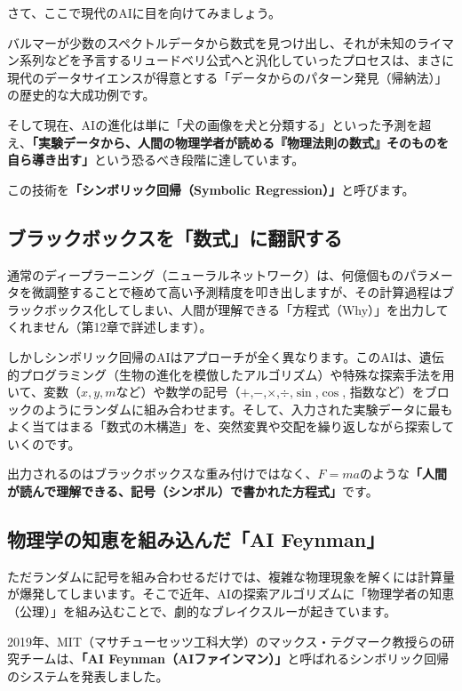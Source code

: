 さて、ここで現代のAIに目を向けてみましょう。

バルマーが少数のスペクトルデータから数式を見つけ出し、それが未知のライマン系列などを予言するリュードベリ公式へと汎化していったプロセスは、まさに現代のデータサイエンスが得意とする「データからのパターン発見（帰納法）」の歴史的な大成功例です。

そして現在、AIの進化は単に「犬の画像を犬と分類する」といった予測を超え、\textbf{「実験データから、人間の物理学者が読める『物理法則の数式』そのものを自ら導き出す」}という恐るべき段階に達しています。

この技術を\textbf{「シンボリック回帰（Symbolic Regression）」}と呼びます。

\subsection{ブラックボックスを「数式」に翻訳する}

通常のディープラーニング（ニューラルネットワーク）は、何億個ものパラメータを微調整することで極めて高い予測精度を叩き出しますが、その計算過程はブラックボックス化してしまい、人間が理解できる「方程式（Why）」を出力してくれません（第12章で詳述します）。

しかしシンボリック回帰のAIはアプローチが全く異なります。このAIは、遺伝的プログラミング（生物の進化を模倣したアルゴリズム）や特殊な探索手法を用いて、変数（\(x, y, m\)など）や数学の記号（\(+\),\(-\),\(\times\),\(\div\),\(\sin\),\(\cos\), 指数など）をブロックのようにランダムに組み合わせます。そして、入力された実験データに最もよく当てはまる「数式の木構造」を、突然変異や交配を繰り返しながら探索していくのです。

出力されるのはブラックボックスな重み付けではなく、\(F=ma\)のような\textbf{「人間が読んで理解できる、記号（シンボル）で書かれた方程式」}です。

\subsection{物理学の知恵を組み込んだ「AI Feynman」}

ただランダムに記号を組み合わせるだけでは、複雑な物理現象を解くには計算量が爆発してしまいます。そこで近年、AIの探索アルゴリズムに「物理学者の知恵（公理）」を組み込むことで、劇的なブレイクスルーが起きています。

2019年、MIT（マサチューセッツ工科大学）のマックス・テグマーク教授らの研究チームは、\textbf{「AI Feynman（AIファインマン）」}と呼ばれるシンボリック回帰のシステムを発表しました。

